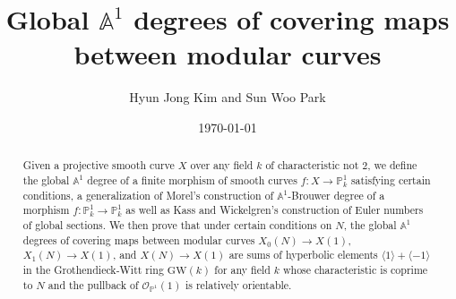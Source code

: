 \documentclass[12pt, reqno]{amsart}
\theoremstyle{definition}
\newcommand{\A}{\mathbb{A}} %
\newcommand{\Proj}{\mathbb{P}} %
\newcommand{\GW}{\mathrm{GW}} %
\begin{document}
\title{Global $\A^1$ degrees of covering maps between modular curves}

\author{Hyun Jong Kim and Sun Woo Park}
\address{Department of Mathematics, University of Wisconsin --
  Madison, 480 Lincoln Dr., Madison, WI 53706, USA}
\address{ Department of Mathematics, University of Wisconsin -- Madison, 480 Linconln Dr., Madison, WI 53706, USA \newline National Institute for Mathematical Sciences, 463-1 Jeonmin-dong, Yuseong-gu, Daejon, 34047, Republic of Korea.}
\date{\today}

\maketitle

\begin{abstract}
Given a projective smooth curve $X$ over any field $k$ of characteristic not $2$, we define the global $\A^1$ degree of a finite morphism of smooth curves $f: X \to \mathbb{P}^1_k$ satisfying certain conditions, a generalization of Morel's construction of $\A^1$-Brouwer degree of a morphism $f: \Proj^1_k \to \Proj^1_k$ as well as Kass and Wickelgren's construction of Euler numbers of global sections. We then prove that under certain conditions on $N$, the global $\A^1$ degrees of covering maps between modular curves $X_0(N) \to X(1)$, $X_1(N) \to X(1)$, and $X(N) \to X(1)$ are sums of hyperbolic elements $\langle 1 \rangle + \langle -1 \rangle$ in the Grothendieck-Witt ring $\GW(k)$ for any field $k$ whose characteristic is coprime to $N$ and the pullback of $\mathscr{O}_{\Proj^1}(1)$ is relatively orientable.
\end{abstract}

\tableofcontents
\end{document}
